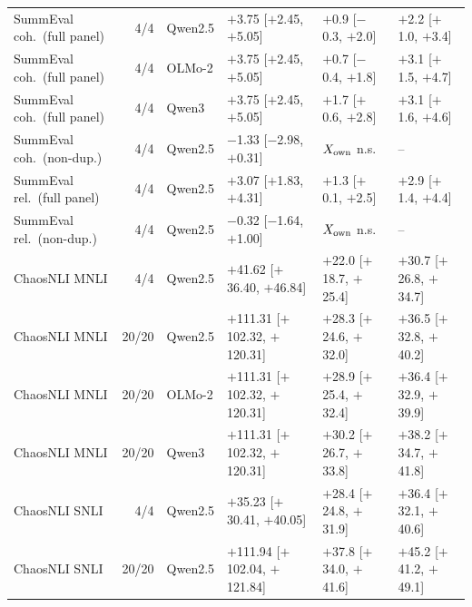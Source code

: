 \begin{table}[t]
\begin{tabular}{lrllll}
SummEval coh.\ (full panel) & 4/4 & Qwen2.5 & $+$3.75 [$+$2.45, $+$5.05] & $+$0.9 [$-$0.3, $+$2.0] & $+$2.2 [$+$1.0, $+$3.4] \\
SummEval coh.\ (full panel) & 4/4 & OLMo-2 & $+$3.75 [$+$2.45, $+$5.05] & $+$0.7 [$-$0.4, $+$1.8] & $+$3.1 [$+$1.5, $+$4.7] \\
SummEval coh.\ (full panel) & 4/4 & Qwen3 & $+$3.75 [$+$2.45, $+$5.05] & $+$1.7 [$+$0.6, $+$2.8] & $+$3.1 [$+$1.6, $+$4.6] \\
SummEval coh.\ (non-dup.) & 4/4 & Qwen2.5 & $-$1.33 [$-$2.98, $+$0.31] & $X_{\rm own}$ n.s. & -- \\
SummEval rel.\ (full panel) & 4/4 & Qwen2.5 & $+$3.07 [$+$1.83, $+$4.31] & $+$1.3 [$+$0.1, $+$2.5] & $+$2.9 [$+$1.4, $+$4.4] \\
SummEval rel.\ (non-dup.) & 4/4 & Qwen2.5 & $-$0.32 [$-$1.64, $+$1.00] & $X_{\rm own}$ n.s. & -- \\
ChaosNLI MNLI & 4/4 & Qwen2.5 & $+$41.62 [$+$36.40, $+$46.84] & $+$22.0 [$+$18.7, $+$25.4] & $+$30.7 [$+$26.8, $+$34.7] \\
ChaosNLI MNLI & 20/20 & Qwen2.5 & $+$111.31 [$+$102.32, $+$120.31] & $+$28.3 [$+$24.6, $+$32.0] & $+$36.5 [$+$32.8, $+$40.2] \\
ChaosNLI MNLI & 20/20 & OLMo-2 & $+$111.31 [$+$102.32, $+$120.31] & $+$28.9 [$+$25.4, $+$32.4] & $+$36.4 [$+$32.9, $+$39.9] \\
ChaosNLI MNLI & 20/20 & Qwen3 & $+$111.31 [$+$102.32, $+$120.31] & $+$30.2 [$+$26.7, $+$33.8] & $+$38.2 [$+$34.7, $+$41.8] \\
ChaosNLI SNLI & 4/4 & Qwen2.5 & $+$35.23 [$+$30.41, $+$40.05] & $+$28.4 [$+$24.8, $+$31.9] & $+$36.4 [$+$32.1, $+$40.6] \\
ChaosNLI SNLI & 20/20 & Qwen2.5 & $+$111.94 [$+$102.04, $+$121.84] & $+$37.8 [$+$34.0, $+$41.6] & $+$45.2 [$+$41.2, $+$49.1] \\
\bottomrule\end{tabular}\end{table}